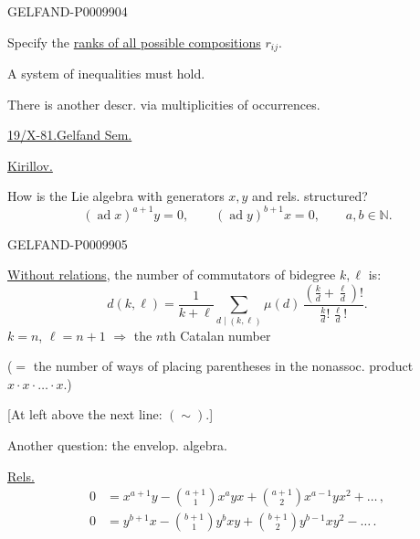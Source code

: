 \begin{GelfandAdjacentEvidence}{GELFAND-P000990}{4}


Specify the \underline{ranks of all possible compositions} $r_{ij}$.

A system of inequalities must hold.

There is another descr. via multiplicities of occurrences.

\underline{\underline{19/X-81.}}\qquad\underline{Gelfand Sem.}

\underline{Kirillov.}

How is the Lie algebra with generators $x,y$ and rels. structured?
\[
(\operatorname{ad}x)^{a+1}y=0,\qquad
(\operatorname{ad}y)^{b+1}x=0,\qquad a,b\in\mathbb{N}.
\]
\end{GelfandAdjacentEvidence}
\begin{GelfandAdjacentEvidence}{GELFAND-P000990}{5}


\underline{Without relations}, the number of commutators of bidegree $k,\ell$ is:
\[
d(k,\ell)=\frac{1}{k+\ell}\sum_{d\mid(k,\ell)}
\mu(d)\,\frac{\left(\frac{k}{d}+\frac{\ell}{d}\right)!}
{\frac{k}{d}!\,\frac{\ell}{d}!}.
\]
$k=n$, $\ell=n+1$ $\Rightarrow$ the $n$th Catalan number

($=$ the number of ways of placing parentheses in the nonassoc. product $x\cdot x\cdot\ldots\cdot x$.)

[At left above the next line: $(\sim)$.]

Another question: the envelop. algebra.

\underline{Rels.}
\begin{align*}
0&=x^{a+1}y-\binom{a+1}{1}x^ayx+\binom{a+1}{2}x^{a-1}yx^2+\ldots\,,\\
0&=y^{b+1}x-\binom{b+1}{1}y^bxy+\binom{b+1}{2}y^{b-1}xy^2-\ldots\,.
\end{align*}
\end{GelfandAdjacentEvidence}
